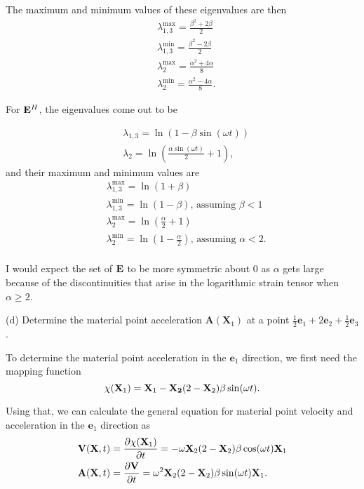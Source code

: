 The maximum and minimum values of these eigenvalues are then
\begin{align*}
    &\lambda_{1,3}^{\text{max}} = \frac{\beta^2 + 2\beta}{2}\\
    &\lambda_{1,3}^{\text{min}} = \frac{\beta^2 - 2\beta}{2}\\
    &\lambda_2^{\text{max}} = \frac{\alpha^2 + 4\alpha}{8}\\
    &\lambda_2^{\text{min}} = \frac{\alpha^2 - 4\alpha}{8}.
\end{align*}

For $\mathbf{E}^H$, the eigenvalues come out to be

\begin{align*}
    &\lambda_{1,3} = \ln (1 - \beta \sin (\omega t))\\
    &\lambda_2 = \ln \left( \frac{\alpha \sin(\omega t)}{2} +1 \right),
\end{align*}
and their maximum and minimum values are
\begin{align*}
    &\lambda_{1,3}^{\text{max}} = \ln (1 + \beta)\\
    &\lambda_{1,3}^{\text{min}} = \ln (1 - \beta) \text{, assuming $\beta < 1$}\\
    &\lambda_2^{\text{max}} = \ln\left(\frac{\alpha}{2} + 1\right)\\
    &\lambda_2^{\text{min}} = \ln \left( 1 - \frac{\alpha}{2}\right) \text{, assuming $\alpha < 2$}.\\
\end{align*}

I would expect the set of $\mathbf{E}$ to be more symmetric about 0 as $\alpha$ gets large because of the discontinuities that arise in the logarithmic strain tensor when $\alpha \geq 2$.

\medskip
(d) Determine the material point acceleration $\bm{A}(\bm{X}_1)$ at a point $\frac{1}{2} \bm{e}_1 + 2\bm{e}_2 + \frac{1}{2} \bm{e}_3$.

To determine the material point acceleration in the $\bm{e}_1$ direction, we first need the mapping function
\begin{equation*}
    \chi (\mathbf{X}_1) = \mathbf{X}_1 - \mathbf{X_2} (2-\mathbf{X}_2)\beta \sin (\omega t).
\end{equation*}

Using that, we can calculate the general equation for material point velocity and acceleration in the $\bm{e}_1$ direction as
\begin{align*}
    &\mathbf{V}(\mathbf{X}, t) = \frac{\partial \chi (\mathbf{X}_1)}{\partial t} = -\omega \mathbf{X}_2 (2- \mathbf{X}_2) \beta \cos (\omega t) \mathbf{X}_1\\
    &\mathbf{A}(\mathbf{X}, t) = \frac{\partial \mathbf{V}}{\partial t} = \omega^2 \mathbf{X}_2 (2 - \mathbf{X}_2) \beta \sin (\omega t) \mathbf{X}_1.
\end{align*}

